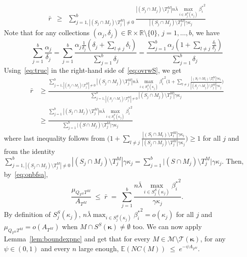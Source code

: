 \documentclass[
  12pt]{article}
\newcommand{\E}{\mathbb{E}}
\newcommand{\R}{\mathbb{R}}
\newcommand{\T}{\mathcal{T}}
\newcommand{\bkappa}{\boldsymbol{\kappa}}
\begin{document}
\begin{eqnarray}\label{eq:ovrwS}
    \bar{r}
    &\geq &\sum_{j=1,|(S_j\cap M_j )\setminus T^M_j|\neq 0}^b\frac{|(S_j\cap M_j )\setminus T^M_j|n\bar{\lambda}\max_{i\in S_j^{S}(\kappa_j)}{\beta_i^*}^2}{|(S_j\cap M_j )\setminus T^M_j|\gamma\kappa_j}
\end{eqnarray}
Note that for any collections $(\alpha_j,\delta_j)\in  \R\times \R\setminus\{0\}$, $j=1,\ldots,b$, we have
\begin{equation}\label{eq:truc}
    \sum_{j=1}^b\frac{\alpha_j}{\delta_j}=
\sum_{j=1}^b\frac{\alpha_j \frac{1}{\delta_j} (\delta_j + \sum_{l \neq j} \delta_l)}{\sum_{j=1}^b \delta_j}=
    \frac{\sum_{j=1}^b\alpha_j(1+\sum_{l\neq j} \frac{\delta_l}{\delta_j})}{\sum_{j=1}^b\delta_j}
\end{equation}
Using~\eqref{eq:truc} in the right-hand side of~\eqref{eq:ovrwS}, we get
\begin{align*}
     \bar{r}
    &\geq \frac{\sum_{j=1,|(S_j\cap M_j )\setminus T^M_j|\neq 0 }^b|(S_j\cap M_j )\setminus T^M_j|n\bar{\lambda}\max_{i\in S_j^{S}(\kappa_j)}{\beta_i^*}^2\Big(1+\sum_{l\neq j}\frac{|(S_l\cap M_l)\setminus T^M_l|\gamma\kappa_l}{|(S_j\cap M_j )\setminus T^M_j|\gamma\kappa_j}\Big)}{\sum_{j=1,|(S_j\cap M_j )\setminus T^M_j|\neq 0}^b|(S_j\cap M_j )\setminus T^M_j|\gamma\kappa_j} \\
    &\geq \frac{\sum_{j=1}^b|(S_j\cap M_j )\setminus T^M_j|n\bar{\lambda}\max_{i\in S_j^{S}(\kappa_j)}{\beta_i^*}^2}{\sum_{j=1}^b \big|(S\cap M_j)\setminus T^M_j\big|\gamma\kappa_j}
\end{align*}
where last inequality follows from $\Big(1+\sum_{l\neq j}\frac{|(S_l\cap M_l)\setminus T^M_l|\gamma\kappa_l}{|(S_j\cap M_j )\setminus T^M_j|\gamma\kappa_j}\Big)\geq 1$ for all $j$ and from the identity $\sum_{j=1,|(S_j\cap M_j )\setminus T^M_j|\neq 0}^b|(S_j\cap M_j )\setminus T^M_j|\gamma\kappa_j=\sum_{j=1}^b \big|(S\cap M_j)\setminus T^M_j\big|\gamma\kappa_j$. Then, %
by~\eqref{eq:onbfsa},
$$\frac{\mu_{Q_{T^M} T^M}}{ A_{T^M}} \;\leq\; \bar{r} \;= \;\sum_{j=1}^b\frac{n\bar{\lambda}\max_{i\in S_j^{S}(\kappa_j)}{\beta_i^*}^2}{\gamma\kappa_j}.$$
By definition of $S_j^{S}(\kappa_j)$, $n\bar{\lambda}\max_{i\in S_j^{S}(\kappa_j)}{\beta_i^*}^2=o(\kappa_j)$ for all $j$ and $\mu_{Q_{T^M} T^M}=o(A_{T^M})$ when $M\cap S^{S}(\bkappa)\neq\emptyset$ too.
We can now apply Lemma~\ref{lem:boundexpnc} and get that for every $M\in \mathcal M\setminus \T(\bkappa)$, for any $\psi\in(0,1)$ and every $n$ large enough, $\E(NC(M))\;\leq\;e^{-\psi A_{T^M}}$.
\end{document}
